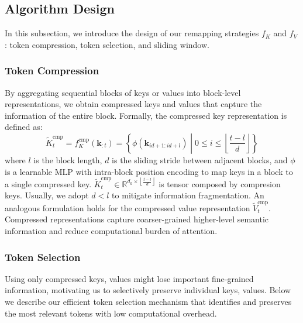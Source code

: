 \subsection{Algorithm Design}
In this subsection, we introduce the design of our remapping strategies \( f_K \) and \( f_V \): token compression, token selection, and sliding window.


\subsubsection{Token Compression} 
By aggregating sequential blocks of keys or values into block-level representations, we obtain compressed keys and values that capture the information of the entire block.
Formally, the compressed key representation is defined as:
\begin{equation}
\tilde{K}^\text{cmp}_t = f_K^\text{cmp}(\mathbf{k}_{:t}) = \left\{\phi(\mathbf{k}_{i d+1: i d+l})\middle| 0\leq i\leq\left\lfloor\frac{t-l}{d}\right\rfloor\right\}
\end{equation}
where \( l \) is the block length, \( d \) is the sliding stride between adjacent blocks, and
\( \phi \) is a learnable MLP with intra-block position encoding to map keys in a block to a single compressed key.
$\tilde{K}_t^\text{cmp}\in \mathbb{R}^{ d_k \times \left\lfloor\frac{t-l}{d}\right\rfloor }$ is tensor composed by compresion keys. 
Usually, we adopt $d < l$ to mitigate information fragmentation.
An analogous formulation holds for the compressed value representation \( \tilde{V}_t^\text{cmp} \). 
Compressed representations capture coarser-grained higher-level semantic information and reduce computational burden of attention.

\subsubsection{Token Selection} 
Using only compressed keys, values might lose important fine-grained information, motivating us to selectively preserve individual keys, values. Below we describe our efficient token selection mechanism that identifies and preserves the most relevant tokens with low computational overhead.

